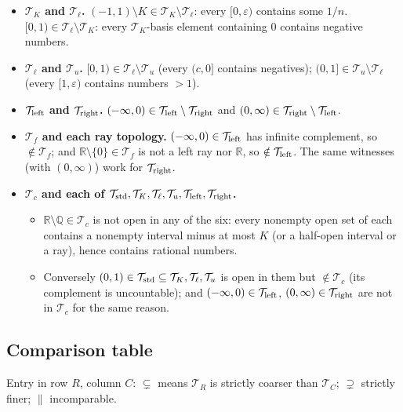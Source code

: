 \documentclass[11pt]{article}
\newcommand{\R}{\mathbb{R}}
\newcommand{\Q}{\mathbb{Q}}
\newcommand{\T}{\mathcal{T}}
\begin{document}
\begin{itemize}
\item \textbf{$\T_K$ and $\T_\ell$.} $(-1,1)\setminus K\in\T_K\setminus\T_\ell$: every $[0,\varepsilon)$ contains some $1/n$. $[0,1)\in\T_\ell\setminus\T_K$: every $\T_K$-basis element containing $0$ contains negative numbers.
\item \textbf{$\T_\ell$ and $\T_u$.} $[0,1)\in\T_\ell\setminus\T_u$ (every $(c,0]$ contains negatives); $(0,1]\in\T_u\setminus\T_\ell$ (every $[1,\varepsilon)$ contains numbers $>1$).
\item \textbf{$\T_{\rm left}$ and $\T_{\rm right}$.} $(-\infty,0)\in\T_{\rm left}\setminus\T_{\rm right}$ and $(0,\infty)\in\T_{\rm right}\setminus\T_{\rm left}$.
\item \textbf{$\T_f$ and each ray topology.} $(-\infty,0)\in\T_{\rm left}$ has infinite complement, so $\notin\T_f$; and $\R\setminus\{0\}\in\T_f$ is not a left ray nor $\R$, so $\notin\T_{\rm left}$. The same witnesses (with $(0,\infty)$) work for $\T_{\rm right}$.
\item \textbf{$\T_c$ and each of $\T_{\rm std},\T_K,\T_\ell,\T_u,\T_{\rm left},\T_{\rm right}$.}
 \begin{itemize}[nosep]
 \item $\R\setminus\Q\in\T_c$ is not open in any of the six: every nonempty open set of each contains a nonempty interval minus at most $K$ (or a half-open interval or a ray), hence contains rational numbers.
 \item Conversely $(0,1)\in\T_{\rm std}\subseteq\T_K,\T_\ell,\T_u$ is open in them but $\notin\T_c$ (its complement is uncountable); and $(-\infty,0)\in\T_{\rm left}$, $(0,\infty)\in\T_{\rm right}$ are not in $\T_c$ for the same reason.
 \end{itemize}
\end{itemize}

\subsection*{Comparison table}
Entry in row $R$, column $C$: $\subsetneq$ means $\T_R$ is strictly coarser than $\T_C$; $\supsetneq$ strictly finer; $\parallel$ incomparable.
\end{document}

